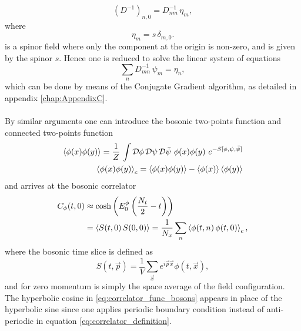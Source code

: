 \begin{equation*}
    (D^{-1})_{n,0} = D^{-1}_{nm} \, \eta_{m},
\end{equation*}
where 
\begin{equation*} 
    \eta_{m} = s \, \delta_{m,0}.
\end{equation*}
is a spinor field where only the component at the origin is non-zero, and is given by the spinor $s$. Hence one is reduced to solve the linear system of equations
\begin{equation*}
    \sum_n D^{-1}_{mn} \, \psi_m = \eta_n,
\end{equation*}
which can be done by means of the Conjugate Gradient algorithm, as detailed in appendix \ref{chap:AppendixC}.\\~\\
By similar arguments one can introduce the bosonic two-points function and connected two-points function 
\begin{equation*}
    \begin{aligned}
        \left\langle \phi(x)\phi(y) \right\rangle = \frac{1}{Z} \, \int \mathcal{D}\phi \, \mathcal{D}\psi \, \mathcal{D}\bar\psi \ \phi(x) \phi(y) \ e^{-S[\phi, \psi, \bar\psi]} \\
        \left\langle \phi(x)\phi(y) \right\rangle_c = \left\langle \phi(x)\phi(y) \right\rangle - \left\langle \phi(x) \right\rangle\left\langle \phi(y) \right\rangle
    \end{aligned}
\end{equation*}
and arrives at the bosonic correlator 
\begin{equation}
    \begin{aligned}
        C_\phi(t,0) &\approx \cosh \left(E_0^{\phi} \left(\frac{N_t}{2} - t\right)\right) \\
        &= \left\langle S(t,0) \, S(0,0) \right\rangle = \frac{1}{N_x} \sum_n \left\langle \phi(t,n) \, \phi(t,0) \right\rangle_c,
    \end{aligned}
    \label{eq:correlator_func_bosons}
\end{equation}
where the bosonic time slice is defined as 
\begin{equation*}
    S(t, \vec{p})=\frac{1}{V} \sum_{\vec{x}} e^{i \vec{p} \vec{x}} \phi(t, \vec{x}),
\end{equation*}
and for zero momentum is simply the space average of the field configuration. \\
The hyperbolic cosine in \eqref{eq:correlator_func_bosons} appears in place of the hyperbolic sine since one applies periodic boundary condition instead of anti-periodic in equation \eqref{eq:correlator_definition}. \\
